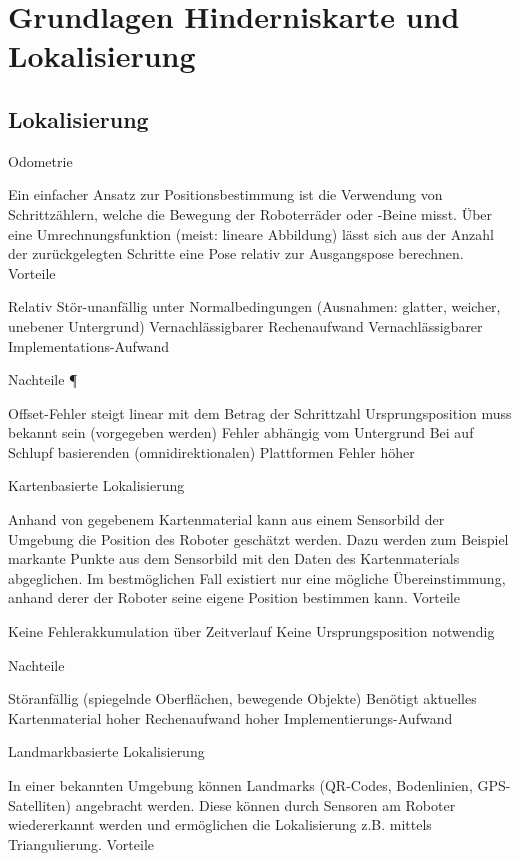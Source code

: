 \section{Grundlagen Hinderniskarte und Lokalisierung}
\label{lokalisierung_grundlagen_sec}
\authorsection{\editordummy}
\subsection{Lokalisierung}
 Odometrie

Ein einfacher Ansatz zur Positionsbestimmung ist die Verwendung von Schrittzählern, welche die Bewegung der Roboterräder oder -Beine misst. Über eine Umrechnungsfunktion (meist: lineare Abbildung) lässt sich aus der Anzahl der zurückgelegten Schritte eine Pose relativ zur Ausgangspose berechnen.
Vorteile

    Relativ Stör-unanfällig unter Normalbedingungen (Ausnahmen: glatter, weicher, unebener Untergrund)
    Vernachlässigbarer Rechenaufwand
    Vernachlässigbarer Implementations-Aufwand 

Nachteile ¶

    Offset-Fehler steigt linear mit dem Betrag der Schrittzahl
    Ursprungsposition muss bekannt sein (vorgegeben werden)
    Fehler abhängig vom Untergrund
    Bei auf Schlupf basierenden (omnidirektionalen) Plattformen Fehler höher 
    
Kartenbasierte Lokalisierung

Anhand von gegebenem Kartenmaterial kann aus einem Sensorbild der Umgebung die Position des Roboter geschätzt werden. Dazu werden zum Beispiel markante Punkte aus dem Sensorbild mit den Daten des Kartenmaterials abgeglichen. Im bestmöglichen Fall existiert nur eine mögliche Übereinstimmung, anhand derer der Roboter seine eigene Position bestimmen kann.
Vorteile

    Keine Fehlerakkumulation über Zeitverlauf
    Keine Ursprungsposition notwendig 

Nachteile

    Störanfällig (spiegelnde Oberflächen, bewegende Objekte)
    Benötigt aktuelles Kartenmaterial
    hoher Rechenaufwand
    hoher Implementierungs-Aufwand 
    
Landmarkbasierte Lokalisierung

In einer bekannten Umgebung können Landmarks (QR-Codes, Bodenlinien, GPS-Satelliten) angebracht werden. Diese können durch Sensoren am Roboter wiedererkannt werden und ermöglichen die Lokalisierung z.B. mittels Triangulierung.
Vorteile

